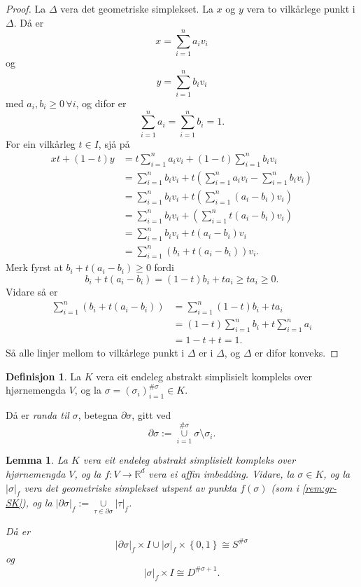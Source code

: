 \documentclass[a4paper, 12pt, norsk]{article}
\theoremstyle{plain}
\newtheorem{lemma}[theorem]{Lemma}
\theoremstyle{definition}
\newtheorem{definition}[theorem]{Definisjon}
\newcommand{\Rb}{\mathbb{R}}
\newcommand{\union}{ \mathop{\cup}\limits }
\newcommand{\gr}[1]{ \lvert #1 \rvert } %
\newcommand{\set}[1]{ \left\{ #1 \right\} } %
\newcommand{\tuple}[1]{ \left( #1 \right) } %
\begin{document}
\begin{proof}
	La \( \Delta \) vera det geometriske simplekset. La \( x \) og  \( y \) vera to vilkårlege punkt i \( \Delta \). Då er
	\[
		x = \sum_{i=1}^n a_i v_i
	\]
	og
	\[
		y = \sum_{i=1}^n b_i v_i
	\]
	med \( a_i, b_i \geq 0 \, \forall i \), og difor er
	\[
		\sum_{i=1}^n a_i = \sum_{i=1}^n b_i = 1.
	\]
	For ein vilkårleg \( t \in I \), sjå på
	\begin{align*}
		xt + (1-t)y &= t \sum_{i=1}^n a_i v_i + (1-t)\sum_{i=1}^n b_i v_i \\
		&= \sum_{i=1}^n b_i v_i +t\tuple{\sum_{i=1}^n a_i v_i-\sum_{i=1}^n b_i v_i} \\
		&= \sum_{i=1}^n b_i v_i +t\tuple{\sum_{i=1}^n (a_i-b_i) v_i} \\
		&= \sum_{i=1}^n b_i v_i +\tuple{\sum_{i=1}^n t(a_i-b_i) v_i} \\
		&= \sum_{i=1}^n b_i v_i +t(a_i-b_i) v_i \\
		&= \sum_{i=1}^n (b_i+t(a_i-b_i)) v_i.
	\end{align*}
	Merk fyrst at \( b_i+t(a_i-b_i) \geq 0 \) fordi 
	\[ 
		b_i+t(a_i-b_i) = (1-t)b_i+ta_i \geq ta_i \geq 0.
	\]
	Vidare så er
	\begin{align*}
		\sum_{i=1}^n (b_i+t(a_i-b_i)) &= \sum_{i=1}^n (1-t)b_i+ta_i \\
		&= (1-t)\sum_{i=1}^n b_i + t \sum_{i=1}^n a_i \\
		&= 1 - t + t = 1.
	\end{align*}
	Så alle linjer mellom to vilkårlege punkt i \( \Delta \) er i \( \Delta \), og \( \Delta \) er difor konveks.
\end{proof}

\begin{definition}
	La \( K \) vera eit endeleg abstrakt simplisielt kompleks over hjørnemengda \( V \), og la \( \sigma = \tuple{\sigma_i}_{i=1}^{\#\sigma} \in K \). 
	
	Då er \emph{randa til \( \sigma \)}, betegna \( \partial\sigma \), gitt ved
	\[
		\partial\sigma := \union_{i = 1}^{\#\sigma} \sigma \setminus \sigma_i.
	\]
\end{definition}

\begin{lemma} \label{thm:utvida-funk}
	La \( K \) vera eit endeleg abstrakt simplisielt kompleks over hjørnemengda \( V \), og la \( f: V \to \Rb^d \) vera ei affin imbedding. Vidare, la \( \sigma \in K \), og la \( \gr{\sigma}_f \) vera det geometriske simplekset utspent av punkta \( f(\sigma) \) (som i \autoref{rem:gr-SK}), og la \( \gr{\partial\sigma}_f := \union_{\tau \in \partial\sigma} \gr{\tau}_f \). 
	
	Då er
	\[
		\gr{\partial\sigma}_f \times I \union \gr{\sigma}_f \times \set{0, 1} \cong S^{\#\sigma}
	\]
	og
	\[
		\gr{\sigma}_f \times I \cong D^{\#\sigma+1}.
	\] 
\end{lemma}
\end{document}
